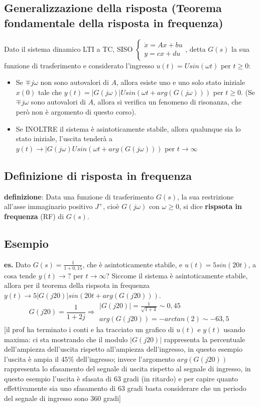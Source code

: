 \subsection{Generalizzazione della risposta (Teorema fondamentale della risposta in frequenza)}
Dato il sistema dinamico LTI a TC, SISO $\begin{cases}
    \dot{x} = Ax +bu\\ 
    y = cx +du
\end{cases}$, detta $G(s)$ la sua funzione di trasferimento e considerato l'ingresso $u(t) = U sin(\omega t)$ per $t\geq 0$:
\begin{itemize}
    \item Se $\mp j \omega$ non sono autovalori di $A$, allora esiste uno e uno solo stato iniziale $x(0)$ tale che $y(t) = |G(j \omega)| U sin(\omega t + arg(G(j \omega)))$ per $t\geq 0$. (Se $\mp j \omega$ sono autovalori di $A$, allora si verifica un fenomeno di risonanza, che però non è argomento di questo corso).
    \item Se INOLTRE il sistema è asintoticamente stabile, allora qualunque sia lo stato iniziale, l'uscita  tenderà a $y(t) \rightarrow |G(j \omega) U sin( \omega t + arg(G(j \omega)))$ per $t \rightarrow  \infty$
\end{itemize}
\subsection{Definizione di risposta in frequenza}
\textbf{definizione}:  Data una funzione di trasferimento $G(s)$, la sua restrizione all'asse immaginario positivo $J^+$, cioè $G(j \omega)$ con $\omega \geq 0$, si dice \textbf{rispsota in frequenza} (RF) di $G(s)$.
\subsection{Esempio}
\textbf{es.} Dato $G(s) = \frac{1}{1+0,15}$, che è asintoticamente stabile, e $u(t) = 5 sin(20 t)$, a cosa tende $y(t) \rightarrow ?$ per $t \rightarrow \infty$?\newline
\newline
Siccome il sistema è asintoticamente stabile, allora per il teorema della rispsota in frequenza $y(t) \rightarrow 5 |G(j 20)| sin(20 t + arg(G(j 20)))$.
\[
    G(j 20) = \frac{1}{1 + 2j} \Rightarrow \begin{matrix}
        |G(j 20)| = \frac{1}{\sqrt{1+4}} \sim  0,45\\
        arg(G(j 20)) = -arctan(2) \sim  -63,5
    \end{matrix}
\]
[il prof ha terminato i conti e ha tracciato un grafico di $u(t)$ e $y(t)$ usando maxima: ci sta mostrando che il modulo $|G(j 20)|$ rappresenta la percentuale dell'ampiezza dell'uscita rispetto all'ampiezza dell'ingresso, in questo esempio l'uscita è ampia il $45\%$ dell'ingresso; invece l'argomento $arg(G(j 20))$ rappresenta lo sfasamento del segnale di uscita rispetto al segnale di ingresso, in questo esempio l'uscita è sfasata di $63$ gradi (in ritardo) e per capire quanto effettivamente sia uno sfasamento di $63$ gradi basta considerare che un periodo del segnale di ingresso sono $360$ gradi]
\newpage
